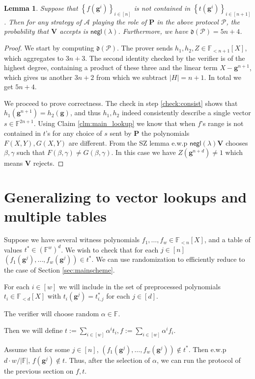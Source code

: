 \documentclass[11pt]{article} %
\newcommand{\F}{\ensuremath{\mathbb F}\xspace}
\newcommand{\adv}{\ensuremath{\mathcal A}\xspace}
\newcommand{\negl}{\ensuremath{\mathsf{negl}(\lambda)}\xspace}
\newcommand{\defeq}{:=}
\newcommand{\sett}[2]{\ensuremath{\set{#1}_{#2}}\xspace}
\newcommand{\prv}{\ensuremath{\mathsf{\mathbf{P}}}\xspace}
\newcommand{\prvpoly}{\ensuremath{\prv}\xspace}
\newcommand{\verpoly}{\ensuremath{\ver}\xspace}%
\newcommand{\ver}{\ensuremath{\mathsf{\mathbf{V}}}\xspace}
\newcommand{\set}[1]{\ensuremath{\left\{#1\right\}}\xspace}
\newcommand{\hgen}{\ensuremath{\mathbf{g}}\xspace}
\newcommand{\polysofdeg}[1]{\ensuremath{\F_{< #1}[X]}\xspace}
\newcommand{\prot}{\ensuremath{\mathscr{P}}\xspace}
\newcommand{\aggdeg}[1]{\ensuremath{\mathfrak{d}(#1)}\xspace}
\newtheorem{lemma}{Lemma}[section]
\newcommand{\sone}{\ensuremath{ h_1}\xspace}
\newcommand{\stwo}{\ensuremath{ h_{2}}\xspace}
\begin{document}
\begin{lemma}\label{lem:lookupprot}
 Suppose that $\sett{f(\hgen^i)}{i\in [n]}$ is not contained in  \sett{t(\hgen^i)}{i\in [n+1]}.
 Then for any strategy of \adv playing the role of \prvpoly in the above protocol \prot, the probability that
 \verpoly accepts is \negl.
 Furthermore, we have $\aggdeg{\prot} = 5n+4$.
\end{lemma}
\begin{proof}
We start by computing $\aggdeg{\prot}$.
The prover sends $\sone,\stwo,Z\in \polysofdeg{n+1}$,
which aggregates to $3n+3$. The second identity checked by the verifier is of the highest degree, containing a product of these three and the linear term $X-\hgen^{n+1}$,
which gives us another $3n+2$ from which we subtract $|H|=n+1$.
In total we get $5n+4$.

We proceed to prove correctness. The check in step \ref{check:consist} shows that $\sone(\hgen^{n+1})=\stwo(\hgen)$, and thus $\sone,\stwo$ indeed consistently describe a single vector $s\in \F^{2n+1}$.
Using Claim \ref{clm:main_lookup} we know that when $f$'s range is not contained in $t$'s for any choice of $s$ sent by \prvpoly the polynomials $F(X,Y), G(X,Y)$ are different.
 From the SZ lemma e.w.p \negl \verpoly chooses $\beta,\gamma$ such that $F(\beta,\gamma)\neq G(\beta,\gamma)$. In this case we have $Z(\hgen^{n+d})\neq 1$ which means \verpoly rejects.
\end{proof}

\section{Generalizing to vector lookups and multiple tables}
Suppose we have several witness polynomials $f_1,\ldots,f_w \in \polysofdeg{n}$,
and a table of values $t^*\in (\F^w)^d$. 
We wish to check that for each $j\in [n]$
$(f_1(\hgen^j),\ldots,f_w(\hgen^j))\in t^*$.
We can use randomization to efficiently reduce to the case of Section \ref{sec:mainscheme}.

For each $i\in [w]$ we will include in the set of preprocessed polynomials $t_i \in \polysofdeg{d}$ with $t_i(\hgen^j) = t^*_{i,j}$ for each $j\in [d]$.

The verifier will choose random $\alpha \in \F$.

Then we will define $t\defeq \sum_{i\in [w]} \alpha^i t_i, f \defeq \sum_{i\in [w]} \alpha^i f_i$.

Assume that for some $j\in [n]$, $(f_1(\hgen^j),\ldots,f_w(\hgen^j))\notin t^*$.
Then e.w.p $d\cdot w/|\F|$, $f(\hgen^j)\notin t$.
Thus, after the selection of $\alpha$,
we can run the protocol of the previous section on $f,t$.
\end{document}
